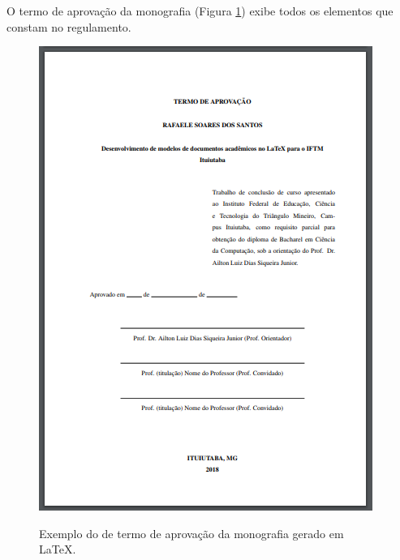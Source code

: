 \newpage
O termo de aprovação da monografia (Figura \ref{aprovmon}) exibe todos os elementos que constam no regulamento.\\
\begin{figure}[h]
	\centering
	\includegraphics{imagens/monografia/TermoAprov.png}\\
	\caption{Exemplo do de termo de aprovação da monografia gerado em LaTeX.}
	\label{aprovmon}
\end{figure}

